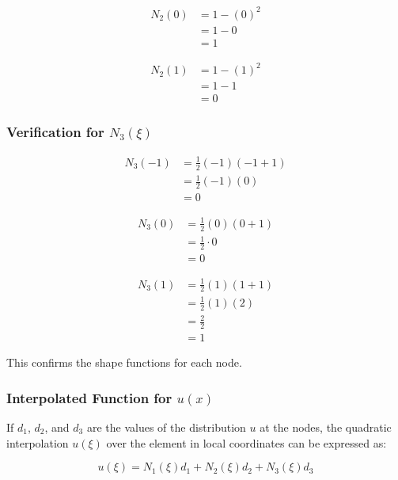 \begin{align*}
    N_2(0) &= 1 - (0)^2 \\
           &= 1 - 0 \\
           &= 1
\end{align*}

\begin{align*}
    N_2(1) &= 1 - (1)^2 \\
           &= 1 - 1 \\
           &= 0
\end{align*}

\subsubsection*{Verification for \( N_3(\xi) \)}

\begin{align*}
    N_3(-1) &= \frac{1}{2}(-1)(-1 + 1) \\
            &= \frac{1}{2}(-1)(0) \\
            &= 0
\end{align*}

\begin{align*}
    N_3(0) &= \frac{1}{2}(0)(0 + 1) \\
           &= \frac{1}{2} \cdot 0 \\
           &= 0
\end{align*}

\begin{align*}
    N_3(1) &= \frac{1}{2}(1)(1 + 1) \\
           &= \frac{1}{2}(1)(2) \\
           &= \frac{2}{2} \\
           &= 1
\end{align*}

This confirms the shape functions for each node.

\subsubsection*{Interpolated Function for \( u(x) \)}

If \( d_1 \), \( d_2 \), and \( d_3 \) are the values of the distribution \( u \) at the nodes, the quadratic interpolation \( u(\xi) \) over the element in local coordinates can be expressed as:

\begin{equation}
    u(\xi) = N_1(\xi) d_1 + N_2(\xi) d_2 + N_3(\xi) d_3
\end{equation}

